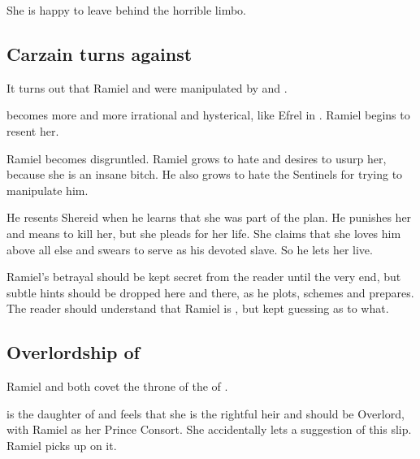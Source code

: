 She is happy to leave behind the horrible limbo.








\subsection{Carzain turns against \Belzir} 
It turns out that Ramiel and \Belzir{} were manipulated by \Secherdamon{} and \Psyrex. 

\Belzir becomes more and more irrational and hysterical, like Efrel in \cite{KarlEdwardWagner:DarknessWeaves}. 
Ramiel begins to resent her. 

Ramiel becomes disgruntled. 
Ramiel grows to hate \Belzir{} and desires to usurp her, because she is an insane bitch. He also grows to hate the Sentinels for trying to manipulate him. 

He resents Shereid when he learns that she was part of the plan. He punishes her and means to kill her, but she pleads for her life. She claims that she loves him above all else and swears to serve as his devoted slave. So he lets her live. 

Ramiel's betrayal should be kept secret from the reader until the very end, but subtle hints should be dropped here and there, as he plots, schemes and prepares. The reader should understand that Ramiel is , but kept guessing as to what.









\subsection[Overlordship of Mystraacht]{Overlordship of \Mystraacht}
Ramiel and \Shiaraid{} both covet the throne of the  of \Mystraacht. 

\Shiaraid{} is the daughter of  and feels that she is the rightful heir and should be Overlord, with Ramiel as her Prince Consort. 
She accidentally lets a suggestion of this slip. 
Ramiel picks up on it. 

